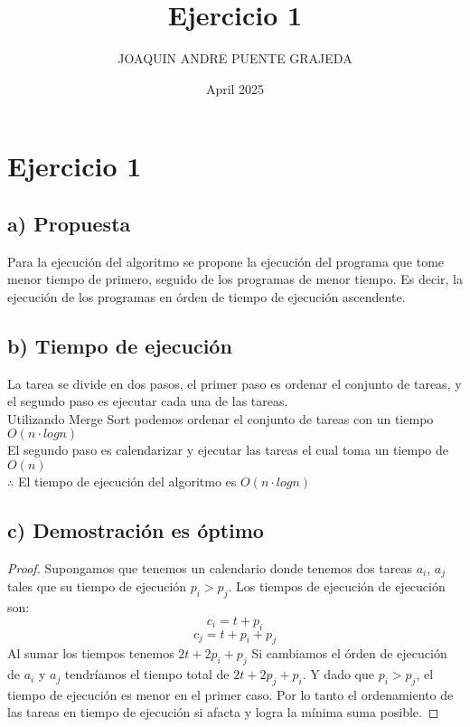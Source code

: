 \documentclass{article}
\title{Ejercicio 1}
\author{JOAQUIN ANDRE PUENTE GRAJEDA}
\date{April 2025}
\begin{document}
    \maketitle

    \section*{Ejercicio 1}
    \subsection*{a) Propuesta}
    Para la ejecución del algoritmo se propone la ejecución del programa que
    tome menor tiempo de primero, seguido de los programas de menor tiempo. Es decir,
    la ejecución de los programas en órden de tiempo de ejecución ascendente.

    \subsection*{b) Tiempo de ejecución}
    La tarea se divide en dos pasos, el primer paso es ordenar el conjunto de tareas,
    y el segundo paso es ejecutar cada una de las tareas.\\
    Utilizando Merge Sort podemos ordenar el conjunto de tareas con un tiempo $O(n \cdot logn)$\\
    El segundo paso es calendarizar y ejecutar las tareas el cual toma un tiempo de $O(n)$\\
    $\therefore$ El tiempo de ejecución del algoritmo es $O(n \cdot logn)$
    
    \subsection*{c) Demostración es óptimo}
    \begin{proof}
        Supongamos que tenemos un calendario donde tenemos dos tareas $a_i$, $a_j$ tales
        que su tiempo de ejecución $p_i > p_j$. Los tiempos de ejecución de ejecución son:
        \[
            c_i = t + p_i
        \]
        \[
            c_j = t + p_i + p_j 
        \]
        Al sumar los tiempos tenemos $2t+2p_i+p_j$
        Si cambiamos el órden de ejecución de $a_i$ y $a_j$ tendríamos el tiempo
        total de $2t+2p_j+p_i$. Y dado que $p_i > p_j$, el tiempo de ejecución es
        menor en el primer caso. Por lo tanto el ordenamiento de las tareas en tiempo
        de ejecución si afacta y logra la mínima suma posible.


    \end{proof}
\end{document}
